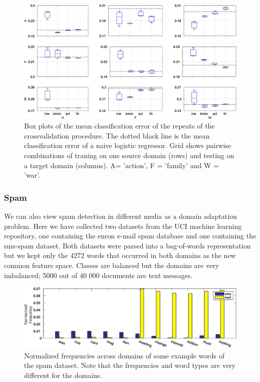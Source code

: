 \documentclass[twoside,11pt]{article}
\begin{document}
\begin{figure}[ht]
	\centering
	\includegraphics[width=.9\textwidth]{images/err_imdb_box.eps}
	\caption{Box plots of the mean classification error of the repeats of the crossvalidation procedure. The dotted black line is the mean classification error of a naive logistic regressor. Grid shows pairwise combinations of traning on one source domain (rows) and testing on a target domain (columns). A= 'action', F = 'family' and W = 'war'.}
	\label{err_imdb}
\end{figure}


\subsubsection{Spam}
We can also view spam detection in different media as a domain adaptation problem. Here we have collected two datasets from the UCI machine learning repository, one containing the enron e-mail spam database and one containing the sms-spam dataset. Both datasets were parsed into a bag-of-words representation but we kept only the 4272 words that occurred in both domains as the new common feature space. Classes are balanced but the domains are very imbalanced; 5000 out of 40 000 documents are text messages.

\begin{figure}[ht]
	\centering
	\includegraphics[width=.9\textwidth]{images/eg_spam.eps}
	\caption{Normalized frequencies across domains of some example words of the spam dataset. Note that the frequencies and word types are very different for the domains.}
	\label{eg_spam}
\end{figure}
\end{document}
